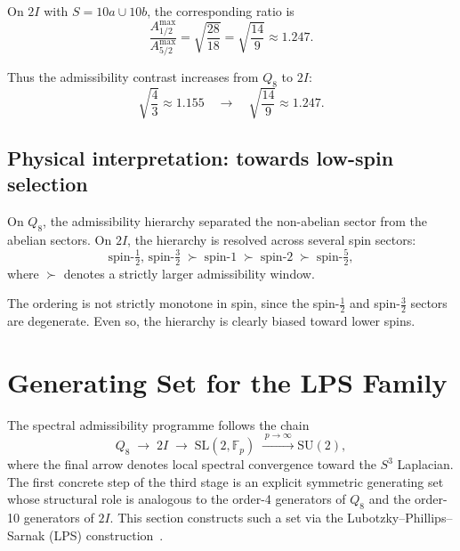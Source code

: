 \documentclass[11pt,a4paper]{article}
\begin{document}
    On $2I$ with $S = 10a \cup 10b$, the corresponding ratio is
    \begin{equation}
      \frac{A^{\max}_{1/2}}{A^{\max}_{5/2}}
      = \sqrt{\frac{28}{18}}
      = \sqrt{\frac{14}{9}}
      \approx 1.247.
      \label{eq:2I-ratio}
    \end{equation}

    Thus the admissibility contrast increases from $Q_8$ to $2I$:
    \begin{equation}
      \sqrt{\frac{4}{3}}
      \approx 1.155
      \quad\longrightarrow\quad
      \sqrt{\frac{14}{9}}
      \approx 1.247.
      \label{eq:growing-hierarchy}
    \end{equation}

  \subsection{Physical interpretation: towards low-spin selection}
    \label{sec:step5-physics}

    On $Q_8$, the admissibility hierarchy separated the non-abelian sector from
    the abelian sectors.
    On $2I$, the hierarchy is resolved across several spin sectors:
    \begin{equation}
      \text{spin-}\tfrac{1}{2},\,\text{spin-}\tfrac{3}{2}
      \;\succ\;
      \text{spin-}1
      \;\succ\;
      \text{spin-}2
      \;\succ\;
      \text{spin-}\tfrac{5}{2},
      \label{eq:spin-ladder}
    \end{equation}
    where $\succ$ denotes a strictly larger admissibility window.

    The ordering is not strictly monotone in spin, since the
    spin-$\tfrac{1}{2}$ and spin-$\tfrac{3}{2}$ sectors are degenerate.
    Even so, the hierarchy is clearly biased toward lower spins.
\section{Generating Set for the LPS Family}
  \label{sec:step6a}

  The spectral admissibility programme follows the chain
  \begin{equation}
    Q_8
    \;\longrightarrow\;
    2I
    \;\longrightarrow\;
    \mathrm{SL}(2,\mathbb{F}_p)
    \;\xrightarrow{\;p \to \infty\;}
    \mathrm{SU}(2),
    \label{eq:chain-6a}
  \end{equation}
  where the final arrow denotes local spectral convergence toward the
  $S^3$ Laplacian.
  The first concrete step of the third stage is an explicit symmetric
  generating set whose structural role is analogous to the order-4
  generators of $Q_8$ and the order-10 generators of $2I$.
  This section constructs such a set via the Lubotzky--Phillips--Sarnak
  (LPS) construction~\cite{LPS1988}.
\end{document}
